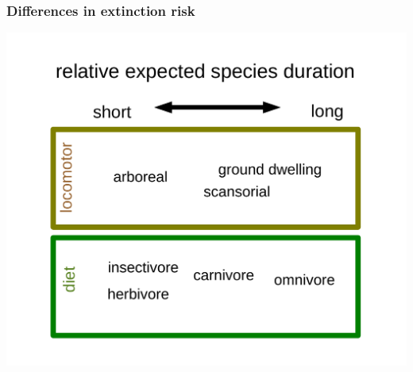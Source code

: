 \documentclass{beamer}
\begin{document}
\begin{frame}
  \frametitle{Differences in extinction risk}

  \begin{center}
    \includegraphics[height=0.8\textheight,width=\textwidth,keepaspectratio=true]{figure/smits_2015_results}
  \end{center}

\end{frame}

%
%

%
%

%
%
\end{document}
